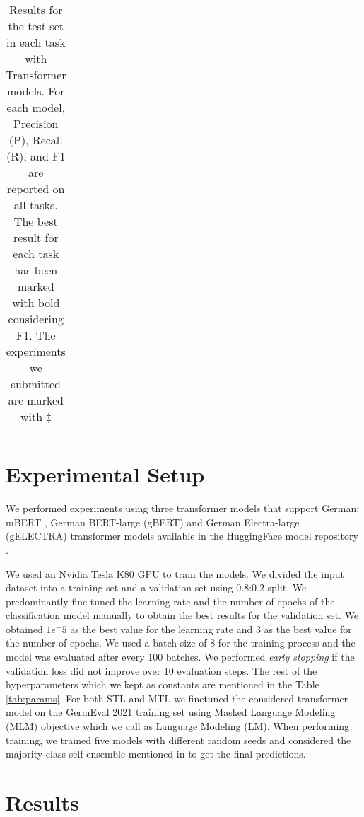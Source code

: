\documentclass[11pt,a4paper]{article}
\begin{document}
\begin{table*}
{\begin{tabular}{l|c|ccc|ccc|ccc}
\hline
\end{tabular}
}
\caption{Results for the test set in each task with Transformer models. For each model, Precision (P), Recall (R), and F1 are reported on all tasks. The best result for each task has been marked with bold considering F1. The experiments we submitted are marked with ${\ddagger}$}
\label{table:test_result}
\end{table*}



\section{Experimental Setup}
\label{sec:Experimental_setup}
We performed experiments using three transformer models that support German; mBERT \cite{devlin2019bert}, German BERT-large (gBERT) \cite{chan-etal-2020-germans} and German Electra-large (gELECTRA) \cite{chan-etal-2020-germans} transformer models available in the HuggingFace model repository \cite{wolf-etal-2020-transformers}. 

We used an Nvidia Tesla K80 GPU to train the models. We divided the input dataset into a training set and a validation set using 0.8:0.2 split. We predominantly fine-tuned the learning rate and the number of epochs of the classification model manually to obtain the best results for the validation set. We obtained $1e^-5$ as the best value for the learning rate and 3 as the best value for the number of epochs. We used a batch size of 8 for the training process and the model was evaluated after every 100 batches. We performed \textit{early stopping} if the validation loss did not improve over 10 evaluation steps. The rest of the hyperparameters which we kept as constants are mentioned in the Table \ref{tab:params}. For both STL and MTL we finetuned the considered transformer model on the GermEval 2021 training set using Masked Language Modeling (MLM) \cite{devlin2019bert} objective which we call as Language Modeling (LM). When performing training, we trained five models with different random seeds and considered the majority-class self ensemble mentioned in \citet{hettiarachchi-ranasinghe-2020-infominer} to get the final predictions.



\section{Results}
\label{sec:results}
\end{document}
